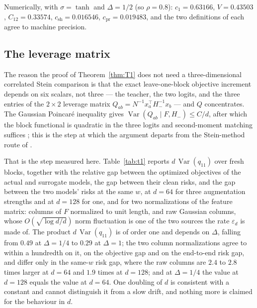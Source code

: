 \documentclass[11pt]{article}
\theoremstyle{definition}
\DeclareMathOperator{\Var}{Var}
\newcommand{\numHermCone}{0.63166}
\newcommand{\numHermCtwelve}{0.33574}
\newcommand{\numHermPr}{0.019483}
\newcommand{\numHermSh}{0.016546}
\newcommand{\numHermV}{0.43503}
\newcommand{\numSwRatioMaxSixtyFour}{2.8}
\newcommand{\numSwRatioMinSixtyFour}{2.4}
\newcommand{\numSwRatioOneTwoEight}{1.9}
\begin{document}
Numerically, with $\sigma=\tanh$ and $\Delta=1/2$ (so $\rho=0.8$): $c_1=\numHermCone$,
$V=\numHermV$, $C_{12}=\numHermCtwelve$, $c_{\mathrm{sh}}=\numHermSh$, $c_{\mathrm{pr}}=\numHermPr$,
and the two definitions of each agree to machine precision.

\subsection{The leverage matrix}

The reason the proof of Theorem~\ref{thm:T1} does not need a three-dimensional correlated Stein comparison is that
the exact leave-one-block objective increment depends on six scalars, not three --- the teacher, the
two logits, and the three entries of the $2\times2$ leverage matrix
$Q_{ab}=N^{-1}x_a^\top H_-^{-1}x_b$ --- and $Q$ concentrates. The Gaussian Poincar\'e inequality
\cite{BLM} gives $\Var(Q_{ab}\mid F,H_-)\le C/d$, after which the block functional is quadratic in
the three logits and second-moment matching suffices \cite{PN24}; this is the step at which the
argument departs from the Stein-method route of \cite{HuLu}.

That is the step measured here. Table~\ref{tab:t1} reports $d\,\Var(q_{11})$ over fresh blocks,
together with the relative gap between the optimized objectives of the actual and surrogate models,
the gap between their clean risks, and the gap between the two models' risks at the same $w$, at
$d=64$ for three augmentation strengths and at $d=128$ for one, and for two normalizations of the
feature matrix: columns of $F$ normalized to unit length, and raw Gaussian columns, whose
$O(\sqrt{\log d/d})$ norm fluctuation is one of the two sources the rate $\varepsilon_d$ is made of.
The product $d\,\Var(q_{11})$ is of order one and depends on $\Delta$, falling from $0.49$ at
$\Delta=1/4$ to $0.29$ at $\Delta=1$; the two column normalizations agree to within a hundredth on
it, on the objective gap and on the end-to-end risk gap, and differ only in the same-$w$ risk gap,
where the raw columns are $\numSwRatioMinSixtyFour$ to $\numSwRatioMaxSixtyFour$ times larger at
$d=64$ and $\numSwRatioOneTwoEight$ times at $d=128$; and at $\Delta=1/4$ the value at $d=128$ equals
the value at $d=64$. One doubling of $d$ is consistent with a constant and cannot distinguish it from
a slow drift, and nothing more is claimed for the behaviour in $d$.
\end{document}
